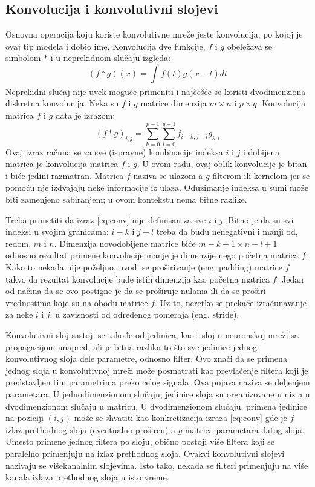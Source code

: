 \subsection{Konvolucija i konvolutivni slojevi} 
Osnovna operacija koju koriste konvolutivne mreže jeste konvolucija, po kojoj je ovaj tip modela i dobio ime. Konvolucija dve funkcije, $f$ i $g$ obeležava se simbolom $\ast$ i u neprekidnom slučaju izgleda:
\begin{equation}
	(f \ast g)(x) = \int_{}^{}f(t)g(x-t)dt 
\end{equation}
Neprekidni slučaj nije uvek moguće primeniti i najčešće se koristi dvodimenziona diskretna konvolucija. Neka su $f$ i $g$ matrice dimenzija $m\times n$ i $p \times q$. Konvolucija matrica $f$ i $g$ data je izrazom:
\begin{equation}
	\label{eq:conv}
	(f \ast g)_{i,j} = \sum_{k=0}^{p-1}\sum_{l=0}^{q-1} f_{i-k, j-l}g_{k,l}
\end{equation}
Ovaj izraz računa se za sve (ispravne) kombinacije indeksa $i$ i $j$ i dobijena matrica je konvolucija matrica $f$ i $g$.
U ovom radu, ovaj oblik konvolucije je bitan i biće jedini razmatran. Matrica $f$ naziva se ulazom a $g$ filterom ili kernelom jer se pomoću nje izdvajaju neke informacije iz ulaza. Oduzimanje indeksa u sumi može biti zamenjeno sabiranjem; u ovom kontekstu nema bitne razlike. 
\par 
Treba primetiti da izraz \eqref{eq:conv} nije definisan za sve $i$ i $j$. Bitno je da su svi indeksi u svojim granicama: $i-k$ i $j-l$ treba da budu nenegativni i manji od, redom, $m$ i $n$. Dimenzija novodobijene matrice biće $m-k+1 \times n-l+1$ odnosno rezultat primene konvolucije manje je dimenzije nego početna matrica $f$. Kako to nekada nije poželjno, uvodi se proširivanje (eng. padding) matrice $f$ takvo da rezultat konvolucije bude istih dimenzija kao početna matrica $f$. Jedan od načina da se ovo postigne je da se proširuje nulama ili da se proširi vrednostima koje su na obodu matrice $f$. Uz to, neretko se prekače izračunavanje za neke $i$ i $j$, u zavisnosti od određenog pomeraja (eng. stride). 
\par 
Konvolutivni sloj sastoji se takođe od jedinica, kao i sloj u neuronskoj mreži sa propagacijom unapred, ali je bitna razlika to što sve jedinice jednog konvolutivnog sloja dele parametre, odnosno filter. Ovo znači da se primena jednog sloja u konvolutivnoj mreži može posmatrati kao prevlačenje filtera koji je predstavljen tim parametrima preko celog signala. Ova pojava naziva se deljenjem parametara. U jednodimenzionom slučaju, jedinice sloja su organizovane u niz a u dvodimenzionom slučaju u matricu. U dvodimenzionom slučaju, primena jedinice na poziciji $(i,j)$ može se shvatiti kao konkretizacija izraza \eqref{eq:conv} gde je $f$ izlaz prethodnog sloja (eventualno proširen) a $g$ matrica parametara datog sloja. Umesto primene jednog filtera po sloju, obično postoji više filtera koji se paralelno primenjuju na izlaz prethodnog sloja. Ovakvi konvolutivni slojevi nazivaju se višekanalnim slojevima. Isto tako, nekada se filteri primenjuju na više kanala izlaza prethodnog sloja u isto vreme.
